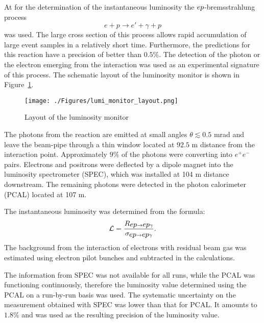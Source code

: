 At \zeus for the determination of the instantaneous luminosity the $\mbox{$e p$}$-bremsstrahlung process 
\begin{equation}
	e + p \rightarrow e' + \gamma + p
\end{equation}
was used. The large cross section of this process allows rapid accumulation of large event samples in a relatively short time. Furthermore, the predictions for this reaction have a precision of better than $0.5\%$. The detection of the photon or the electron emerging from the interaction was used as an experimental signature of this process. The schematic layout of the luminosity monitor is shown in Figure~\ref{fig:lumi_monitor_layout}.
\begin{figure}
	\centering
		\texttt{[image: ./Figures/lumi\_monitor\_layout.png]}
	\caption{Layout of the \zeus luminosity monitor}
	\label{fig:lumi_monitor_layout}
\end{figure}
The photons from the reaction are emitted at small angles $\theta \lesssim 0.5$ mrad and leave the beam-pipe through a thin window located at $92.5$ m distance from the interaction point. Approximately $9\%$ of the photons were converting into $e^+e^-$ pairs. Electrons and positrons were deflected by a dipole magnet into the luminosity spectrometer (SPEC), which was installed at 104 m distance downstream. The remaining photons were detected in the photon calorimeter (PCAL) located at 107 m.

The instantaneous luminosity was determined from the formula:
\begin{equation}
\mathcal{L} = \frac{R_{\mbox{$e p$}\rightarrow \mbox{$e p$}\gamma}}{ \sigma_{\mbox{$e p$}\rightarrow \mbox{$e p$}\gamma}}.
\end{equation}
The background from the interaction of electrons with residual beam gas was estimated using electron pilot bunches and subtracted in the calculations.

The information from SPEC was not available for all runs, while the PCAL was functioning continuously, therefore the luminosity value determined using the PCAL on a run-by-run basis was used. The systematic uncertainty on the measurement obtained with SPEC was lower than that for PCAL. It amounts to $1.8\%$ and was used as the resulting precision of the luminosity value.

